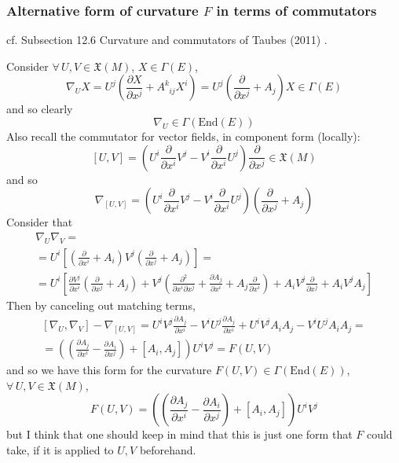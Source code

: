 \documentclass[10pt]{amsart}
\begin{document}
\subsubsection{Alternative form of curvature $F$ in terms of commutators}
cf. Subsection 12.6 Curvature and commutators of Taubes (2011) \cite{CTaubes2011}.  

Consider $\forall \, U,V \in \mathfrak{X}(M)$, $X\in \Gamma(E)$,
\[
\nabla_U X = U^j \left( \frac{ \partial X}{ \partial x^j} + A^k_{ \; \; ij} X^i \right) = U^j \left( \frac{ \partial }{ \partial x^j } + A_j \right) X \in \Gamma(E)
\]
and so clearly 
\[
\nabla_U \in \Gamma(\text{End}(E))
\]
Also recall the commutator for vector fields, in component form (locally):
\[
[U,V] = \left( U^i \frac{ \partial }{ \partial x^i} V^j -  V^i \frac{ \partial }{ \partial x^i} U^j \right) \frac{ \partial }{ \partial x^j} \in \mathfrak{X}(M)
\]
and so 
\[
\nabla_{[U,V]} = \left( U^i \frac{ \partial }{ \partial x^i } V^j - V^i \frac{ \partial }{ \partial x^i } U^j \right) \left( \frac{ \partial }{ \partial x^j } + A_j \right)
\]
Consider that 
\[
\begin{gathered}
\nabla_U \nabla_V = \\
 = U^i \left[ \left( \frac{ \partial }{ \partial x^i } + A_i \right) V^j \left( \frac{ \partial }{ \partial x^j} + A_j \right) \right] = \\
  = U^i \left[  \frac{ \partial V^j}{ \partial x^i} \left( \frac{ \partial }{ \partial x^j} + A_j \right) + V^j \left( \frac{ \partial^2}{ \partial x^i \partial x^j } + \frac{ \partial A_j }{ \partial x^i } + A_j \frac{ \partial }{ \partial x^i } \right) + A_i V^j \frac{ \partial }{ \partial x^j} + A_i V^j A_j \right]
\end{gathered}
\]
Then by canceling out matching terms, 
\[
\begin{gathered}
  [ \nabla_U, \nabla_V ] - \nabla_{[U,V] } = U^i V^j \frac{ \partial A_j}{ \partial x^i} - V^i U^j \frac{ \partial A_j}{ \partial x^i} + U^i V^j A_i A_j - V^i U^j A_i A_j = \\
  = \left( \left( \frac{ \partial A_j }{ \partial x^i } - \frac{ \partial A_i}{ \partial x^j} \right) + [A_i, A_j] \right) U^i V^j = F(U,V)
\end{gathered}
\]
and so we have this form for the curvature $F(U,V) \in \Gamma(\text{End}(E))$, $\forall \, U,V \in \mathfrak{X}(M)$, 
\[
F(U,V) = \left( \left( \frac{ \partial A_j}{ \partial x^i } - \frac{ \partial A_i}{ \partial x^j } \right) + [A_i,A_j] \right)U^i V^j
\]
but I think that one should keep in mind that this is just one form that $F$ could take, if it is applied to $U,V$ beforehand.  
\end{document}

